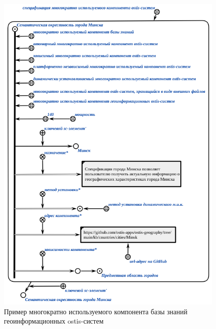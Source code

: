 \begin{figure}[H]
	\includegraphics[scale=0.8]{author/part7/figures/gis_kb_component.png}
	\caption{Пример многократно используемого компонента базы знаний геоинформационных ostis-систем}
	\label{fig:gis_kb_component}
\end{figure}

